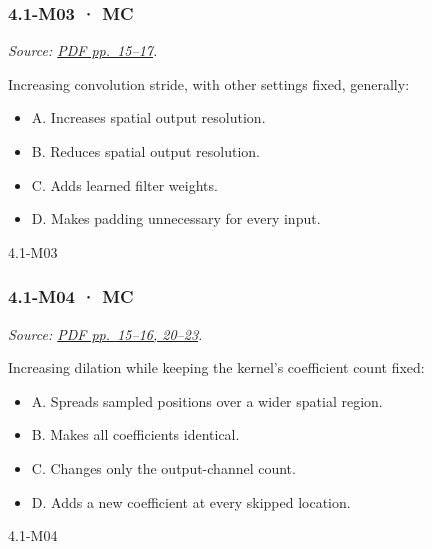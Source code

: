 \noindent\begin{minipage}{\linewidth}

\subsubsection{4.1-M03 · MC}\label{m03-mc-11}

\emph{Source: \href{../Lecture\%20Slides/4.1.\%20CNNs.pdf\#page=15}{PDF
pp.~15--17}.}

Increasing convolution stride, with other settings fixed, generally:

\begin{itemize}
\tightlist
\item
  A. Increases spatial output resolution.
\item
  B. Reduces spatial output resolution.
\item
  C. Adds learned filter weights.
\item
  D. Makes padding unnecessary for every input.
\end{itemize}

\begin{solution}[8mm]{4.1-M03}

\end{solution}
\end{minipage}\par\medskip

\noindent\begin{minipage}{\linewidth}

\subsubsection{4.1-M04 · MC}\label{m04-mc-11}

\emph{Source: \href{../Lecture\%20Slides/4.1.\%20CNNs.pdf\#page=15}{PDF
pp.~15--16, 20--23}.}

Increasing dilation while keeping the kernel's coefficient count fixed:

\begin{itemize}
\tightlist
\item
  A. Spreads sampled positions over a wider spatial region.
\item
  B. Makes all coefficients identical.
\item
  C. Changes only the output-channel count.
\item
  D. Adds a new coefficient at every skipped location.
\end{itemize}

\begin{solution}[8mm]{4.1-M04}

\end{solution}
\end{minipage}\par\medskip

